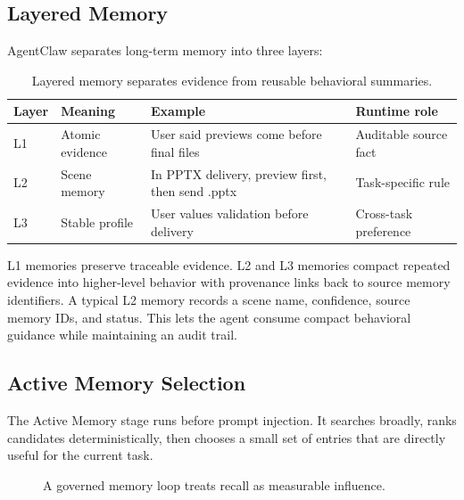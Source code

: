 \documentclass[11pt]{article}
\begin{document}
\subsection{Layered Memory}

AgentClaw separates long-term memory into three layers:

\begin{table}[h]
\centering
\small
\begin{tabular}{llll}
\toprule
Layer & Meaning & Example & Runtime role \\
\midrule
L1 & Atomic evidence & User said previews come before final files & Auditable source fact \\
L2 & Scene memory & In PPTX delivery, preview first, then send .pptx & Task-specific rule \\
L3 & Stable profile & User values validation before delivery & Cross-task preference \\
\bottomrule
\end{tabular}
\caption{Layered memory separates evidence from reusable behavioral summaries.}
\label{tab:layers}
\end{table}

L1 memories preserve traceable evidence. L2 and L3 memories compact repeated
evidence into higher-level behavior with provenance links back to source memory
identifiers. A typical L2 memory records a scene name, confidence, source memory
IDs, and status. This lets the agent consume compact behavioral guidance while
maintaining an audit trail.

\subsection{Active Memory Selection}

The Active Memory stage runs before prompt injection. It searches broadly, ranks
candidates deterministically, then chooses a small set of entries that are
directly useful for the current task.

\begin{figure}[h]
\centering
{}
\caption{A governed memory loop treats recall as measurable influence.}
\label{fig:control}
\end{figure}
\end{document}
